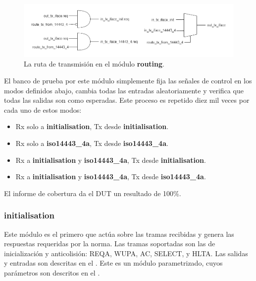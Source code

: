 \documentclass[a4paper, twoside, 11pt]{report}
\begin{document}
\begin{figure}[htb]
  \centering
  \includegraphics[width=1.0\textwidth]{./img/routing_tx.drawio}
  \caption{La ruta de transmisión en el módulo \textbf{routing}.}
  \label{fig:routing_tx}
\end{figure}

El banco de prueba por este módulo simplemente fija las señales de control en los modos definidos abajo, cambia todas las entradas aleatoriamente y verifica que todas las salidas son como esperadas. Este proceso es repetido diez mil veces por cada uno de estos modos:

\begin{itemize}
  \item Rx solo a \textbf{initialisation}, Tx desde \textbf{initialisation}.
  \item Rx solo a \textbf{iso14443\_4a}, Tx desde \textbf{iso14443\_4a}.
  \item Rx a \textbf{initialisation} y \textbf{iso14443\_4a}, Tx desde \textbf{initialisation}.
  \item Rx a \textbf{initialisation} y \textbf{iso14443\_4a}, Tx desde \textbf{iso14443\_4a}.
\end{itemize}

El informe de cobertura da el DUT un resultado de 100\%.

\FloatBarrier
\subsubsection{initialisation}
\label{sec:initialisation}

Este módulo es el primero que actúa sobre las tramas recibidas y genera las respuestas requeridas por la norma. Las tramas soportadas son las de inicialización y anticolisión: REQA, WUPA, AC, SELECT, y HLTA. Las salidas y entradas son descritas en el . Este es un módulo parametrizado, cuyos parámetros son descritos en el .
\end{document}

